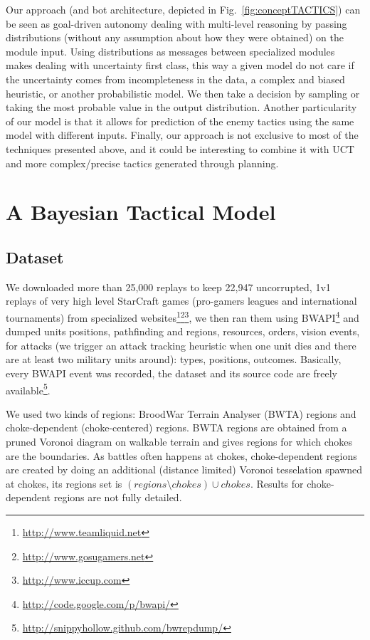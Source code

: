 Our approach (and bot architecture, depicted in Fig.~\ref{fig:conceptTACTICS}) can be seen as goal-driven autonomy \cite{Weber2010cr} dealing with multi-level reasoning by passing distributions (without any assumption about how they were obtained) on the module input. Using distributions as messages between specialized modules makes dealing with uncertainty first class, this way a given model do not care if the uncertainty comes from incompleteness in the data, a complex and biased heuristic, or another probabilistic model. We then take a decision by sampling or taking the most probable value in the output distribution. Another particularity of our model is that it allows for prediction of the enemy tactics using the same model with different inputs. Finally, our approach is not exclusive to most of the techniques presented above, and it could be interesting to combine it with UCT \cite{Balla_uctfor} and more complex/precise tactics generated through planning.

\section{A Bayesian Tactical Model}
\subsection{Dataset}
We downloaded more than 25,000 replays to keep 22,947 uncorrupted, 1v1 replays of very high level StarCraft games (pro-gamers leagues and international tournaments) from specialized websites\footnote{\url{http://www.teamliquid.net}}\footnote{\url{http://www.gosugamers.net}}\footnote{\url{http://www.iccup.com}}, we then ran them using BWAPI\footnote{\url{http://code.google.com/p/bwapi/}} and dumped units positions, pathfinding and regions, resources, orders, vision events, for attacks (we trigger an attack tracking heuristic when one unit dies and there are at least two military units around): types, positions, outcomes. Basically, every BWAPI event was recorded, the dataset and its source code are freely available\footnote{\url{http://snippyhollow.github.com/bwrepdump/}}. 

We used two kinds of regions: BroodWar Terrain Analyser (BWTA) regions and choke-dependent (choke-centered) regions. BWTA regions are obtained from a pruned Voronoi diagram on walkable terrain \cite{Perkins2010} and gives regions for which chokes are the boundaries. As battles often happens at chokes, choke-dependent regions are created by doing an additional (distance limited) Voronoi tesselation spawned at chokes, its regions set is $(regions \setminus chokes) \cup chokes$. Results for choke-dependent regions are not fully detailed.

